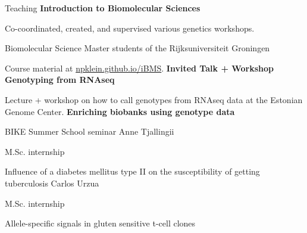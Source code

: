 \begin{rubric}{Teaching}
%
%
%
	\textbf{Introduction to Biomolecular Sciences} \par
	 Co-coordinated, created, and supervised various genetics workshops. \par
	 Biomolecular Science Master students of the Rijksuniversiteit Groningen \par
	 Course material at \url{npklein.github.io/iBMS}.
%
\entry*[26 Aug 2016]%
\textbf{Invited Talk + Workshop Genotyping from RNAseq} \par
Lecture + workshop on how to call genotypes from RNAseq data at the Estonian Genome Center.
%
\entry*[22 Jun 2016]%
\textbf{Enriching biobanks using genotype data} \par
BIKE Summer School seminar
%
%
Anne Tjallingii \par
M.Sc. internship \par
Influence of a diabetes mellitus type II on the susceptibility of getting tuberculosis
%
%
Carlos Urzua \par
M.Sc. internship \par
Allele-specific signals in gluten sensitive t-cell clones

\end{rubric}